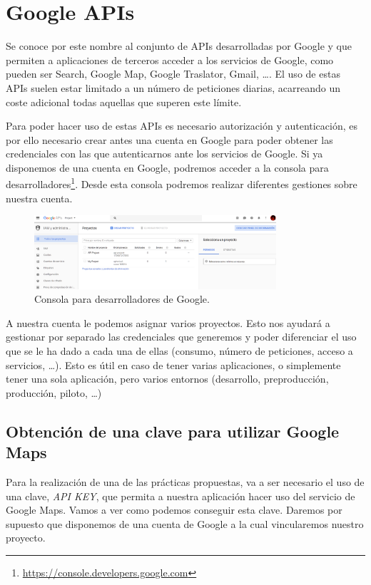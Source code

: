 \chapter{Google APIs}\label{ch:google_api}

Se conoce por este nombre al conjunto de \glspl{API} desarrolladas por Google y que permiten a aplicaciones de terceros acceder a los servicios de Google, como pueden ser Search, Google Map, Google Traslator, Gmail, \ldots. El uso de estas \glspl{API} suelen estar limitado a un número de peticiones diarias, acarreando un coste adicional todas aquellas que superen este límite.

Para poder hacer uso de estas \glspl{API} es necesario autorización y autenticación, es por ello necesario crear antes una cuenta en Google para poder obtener las credenciales con las que autenticarnos ante los servicios de Google. Si ya disponemos de una cuenta en Google, podremos acceder a la consola para desarrolladores\footnote{\url{https://console.developers.google.com}}. Desde esta consola podremos realizar diferentes gestiones sobre nuestra cuenta.

\begin{figure}[H]
\centering
  \includegraphics[width=0.8\textwidth]{Figures/anexo/google_api/developer_console}
  \caption{Consola para desarrolladores de Google.}
\end{figure}

A nuestra cuenta le podemos asignar varios proyectos. Esto nos ayudará a gestionar por separado las credenciales que generemos y poder diferenciar el uso que se le ha dado a cada una de ellas (consumo, número de peticiones, acceso a servicios, \ldots). Esto es útil en caso de tener varias aplicaciones, o simplemente tener una sola aplicación, pero varios entornos (desarrollo, preproducción, producción, piloto, \ldots)

\section{Obtención de una clave para utilizar Google Maps}

Para la realización de una de las prácticas propuestas, va a ser necesario el uso de una clave, \emph{API KEY}, que permita a nuestra aplicación hacer uso del servicio de Google Maps. Vamos a ver como podemos conseguir esta clave. Daremos por supuesto que disponemos de una cuenta de Google a la cual vincularemos nuestro proyecto.

